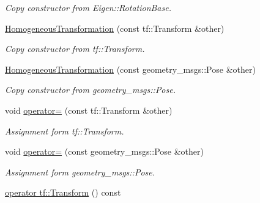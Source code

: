 \begin{DoxyCompactItemize}
\begin{DoxyCompactList}\small\item\em Copy constructor from Eigen\+::\+Rotation\+Base. \end{DoxyCompactList}\item 
\hyperlink{classow__core_1_1HomogeneousTransformation_a93c036ece8c23ef2fc7a9d38a59ff7e8}{Homogeneous\+Transformation} (const tf\+::\+Transform \&other)\hypertarget{classow__core_1_1HomogeneousTransformation_a93c036ece8c23ef2fc7a9d38a59ff7e8}{}\label{classow__core_1_1HomogeneousTransformation_a93c036ece8c23ef2fc7a9d38a59ff7e8}

\begin{DoxyCompactList}\small\item\em Copy constructor from tf\+::\+Transform. \end{DoxyCompactList}\item 
\hyperlink{classow__core_1_1HomogeneousTransformation_af4078447d97d97921a1cde705c661228}{Homogeneous\+Transformation} (const geometry\+\_\+msgs\+::\+Pose \&other)\hypertarget{classow__core_1_1HomogeneousTransformation_af4078447d97d97921a1cde705c661228}{}\label{classow__core_1_1HomogeneousTransformation_af4078447d97d97921a1cde705c661228}

\begin{DoxyCompactList}\small\item\em Copy constructor from geometry\+\_\+msgs\+::\+Pose. \end{DoxyCompactList}\item 
void \hyperlink{classow__core_1_1HomogeneousTransformation_a52c2ab8ad47f43b8c94a7d5576e8c842}{operator=} (const tf\+::\+Transform \&other)\hypertarget{classow__core_1_1HomogeneousTransformation_a52c2ab8ad47f43b8c94a7d5576e8c842}{}\label{classow__core_1_1HomogeneousTransformation_a52c2ab8ad47f43b8c94a7d5576e8c842}

\begin{DoxyCompactList}\small\item\em Assignment form tf\+::\+Transform. \end{DoxyCompactList}\item 
void \hyperlink{classow__core_1_1HomogeneousTransformation_a020a141fc151737a9671df9448e954a9}{operator=} (const geometry\+\_\+msgs\+::\+Pose \&other)\hypertarget{classow__core_1_1HomogeneousTransformation_a020a141fc151737a9671df9448e954a9}{}\label{classow__core_1_1HomogeneousTransformation_a020a141fc151737a9671df9448e954a9}

\begin{DoxyCompactList}\small\item\em Assignment form geometry\+\_\+msgs\+::\+Pose. \end{DoxyCompactList}\item 
\hyperlink{classow__core_1_1HomogeneousTransformation_a223412eca2309326b0f672a38c1e6a44}{operator tf\+::\+Transform} () const \hypertarget{classow__core_1_1HomogeneousTransformation_a223412eca2309326b0f672a38c1e6a44}{}\label{classow__core_1_1HomogeneousTransformation_a223412eca2309326b0f672a38c1e6a44}


\end{DoxyCompactItemize}
